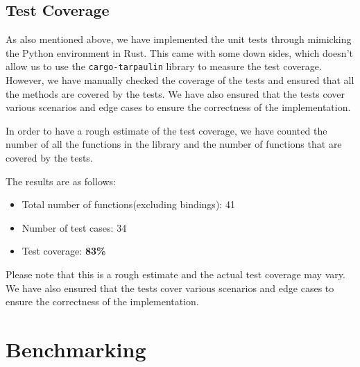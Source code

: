 \documentclass[review]{AIM_report}
\begin{document}
\subsection{Test Coverage}
As also mentioned above, we have implemented the unit tests through mimicking the Python environment in Rust.
This came with some down sides, which doesn't allow us to use the \texttt{cargo-tarpaulin} library to measure the test coverage.
However, we have manually checked the coverage of the tests and ensured that all the methods are covered by the tests. We have also ensured that the tests cover various scenarios and edge cases to ensure the correctness of the implementation.

In order to have a rough estimate of the test coverage, we have counted the number of all the functions in the library and the number of functions that are covered by the tests.

The results are as follows:
\begin{itemize}
    \item Total number of functions(excluding bindings): 41
    \item Number of test cases: 34
    \item Test coverage: \textbf{83\%}
\end{itemize}

Please note that this is a rough estimate and the actual test coverage may vary. We have also ensured that the tests cover various scenarios and edge cases to ensure the correctness of the implementation.

\newpage
\section{Benchmarking}
\newpage
\pagestyle{empty}



\newpage
\pagestyle{empty}



\newpage
\pagestyle{empty}


\end{document}
